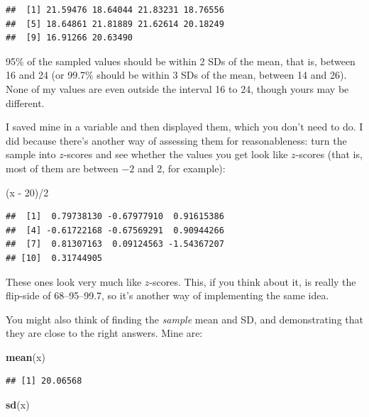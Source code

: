 \documentclass[]{tufte-book}
\newenvironment{Shaded}{}{}
\newcommand{\DecValTok}[1]{\textcolor[rgb]{0.25,0.63,0.44}{#1}}
\newcommand{\KeywordTok}[1]{\textcolor[rgb]{0.00,0.44,0.13}{\textbf{#1}}}
\newcommand{\NormalTok}[1]{#1}
\newcommand{\OperatorTok}[1]{\textcolor[rgb]{0.40,0.40,0.40}{#1}}
\newcommand{\StringTok}[1]{\textcolor[rgb]{0.25,0.44,0.63}{#1}}
\theoremstyle{definition}
\theoremstyle{definition}
\theoremstyle{definition}
\theoremstyle{remark}
\begin{document}
\begin{verbatim}
##  [1] 21.59476 18.64044 21.83231 18.76556
##  [5] 18.64861 21.81889 21.62614 20.18249
##  [9] 16.91266 20.63490
\end{verbatim}

95\% of the sampled values should be within 2 SDs of the mean, that is,
between 16 and 24 (or 99.7\% should be within 3 SDs of the mean, between
14 and 26). None of my values are even outside the interval 16 to 24,
though yours may be different.

I saved mine in a variable and then displayed them, which you don't need
to do. I did because there's another way of assessing them for
reasonableness: turn the sample into \(z\)-scores and see whether the
values you get look like \(z\)-scores (that is, most of them are between
\(-2\) and 2, for example):

\begin{Shaded}
\begin{Highlighting}[]
\NormalTok{(x }\OperatorTok{-}\StringTok{ }\DecValTok{20}\NormalTok{)}\OperatorTok{/}\DecValTok{2}
\end{Highlighting}
\end{Shaded}

\begin{verbatim}
##  [1]  0.79738130 -0.67977910  0.91615386
##  [4] -0.61722168 -0.67569291  0.90944266
##  [7]  0.81307163  0.09124563 -1.54367207
## [10]  0.31744905
\end{verbatim}

These ones look very much like \(z\)-scores. This, if you think about
it, is really the flip-side of 68--95--99.7, so it's another way of
implementing the same idea.

You might also think of finding the \emph{sample} mean and SD, and
demonstrating that they are close to the right answers. Mine are:

\begin{Shaded}
\begin{Highlighting}[]
\KeywordTok{mean}\NormalTok{(x)}
\end{Highlighting}
\end{Shaded}

\begin{verbatim}
## [1] 20.06568
\end{verbatim}

\begin{Shaded}
\begin{Highlighting}[]
\KeywordTok{sd}\NormalTok{(x)}
\end{Highlighting}
\end{Shaded}
\end{document}
